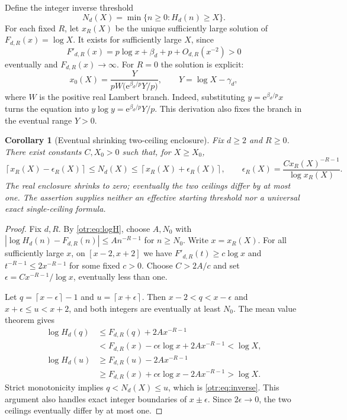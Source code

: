 \documentclass[11pt,a4paper]{article}
\newtheorem{corollary}[theorem]{Corollary}
\theoremstyle{definition}\newtheorem{definition}[theorem]{Definition}
\theoremstyle{remark}\newtheorem{remark}[theorem]{Remark}
\newcommand{\e}{\mathrm e}
\newcommand{\ceil}[1]{\left\lceil #1\right\rceil}
\begin{document}
Define the integer inverse threshold
\[
 N_d(X)=\min\{n\ge0:H_d(n)\ge X\}.
\]
For each fixed $R$, let $x_R(X)$ be the unique sufficiently large solution of
$F_{d,R}(x)=\log X$. It exists for sufficiently large $X$, since
\begin{equation}\label{otr:eq:deriv}
 F'_{d,R}(x)=p\log x+\beta_d+p+O_{d,R}(x^{-2})>0
\end{equation}
eventually and $F_{d,R}(x)\to\infty$. For $R=0$ the solution is explicit:
\begin{equation}\label{otr:eq:Lambert}
 x_0(X)=\frac{Y}{pW\bigl(\e^{\beta_d/p}Y/p\bigr)},
 \qquad Y=\log X-\gamma_d,
\end{equation}
where $W$ is the positive real Lambert branch. Indeed, substituting
$y=\e^{\beta_d/p}x$ turns the equation into
$y\log y=\e^{\beta_d/p}Y/p$. This derivation also fixes the branch in the eventual range $Y>0$.

\begin{corollary}[Eventual shrinking two-ceiling enclosure]\label{otr:cor:inverse}
Fix $d\ge2$ and $R\ge0$. There exist constants $C,X_0>0$ such that, for $X\ge X_0$,
\begin{equation}\label{otr:eq:inverse}
 \ceil{x_R(X)-\epsilon_R(X)}\le N_d(X)
 \le\ceil{x_R(X)+\epsilon_R(X)},\qquad
 \epsilon_R(X)=\frac{C x_R(X)^{-R-1}}{\log x_R(X)}.
\end{equation}
The real enclosure shrinks to zero; eventually the two ceilings differ by at most one. The assertion supplies neither an effective starting threshold nor a universal exact single-ceiling formula.
\end{corollary}
\begin{proof}
Fix $d,R$. By \eqref{otr:eq:logH}, choose $A,N_0$ with
$|\log H_d(n)-F_{d,R}(n)|\le A n^{-R-1}$ for $n\ge N_0$.
Write $x=x_R(X)$. For all sufficiently large $x$, on $[x-2,x+2]$ we have
$F'_{d,R}(t)\ge c\log x$ and $t^{-R-1}\le2x^{-R-1}$ for some fixed $c>0$. Choose $C>2A/c$ and set $\epsilon=Cx^{-R-1}/\log x$, eventually less than one.

Let $q=\ceil{x-\epsilon}-1$ and $u=\ceil{x+\epsilon}$. Then
$x-2<q<x-\epsilon$ and $x+\epsilon\le u<x+2$, and both integers are eventually at least $N_0$. The mean value theorem gives
\begin{align*}
 \log H_d(q)&\le F_{d,R}(q)+2A x^{-R-1}\\
 &<F_{d,R}(x)-c\epsilon\log x+2Ax^{-R-1}<\log X,\\
 \log H_d(u)&\ge F_{d,R}(u)-2Ax^{-R-1}\\
 &\ge F_{d,R}(x)+c\epsilon\log x-2Ax^{-R-1}>\log X.
\end{align*}
Strict monotonicity implies $q<N_d(X)\le u$, which is \eqref{otr:eq:inverse}. This argument also handles exact integer boundaries of $x\pm\epsilon$. Since $2\epsilon\to0$, the two ceilings eventually differ by at most one.
\end{proof}
\end{document}

